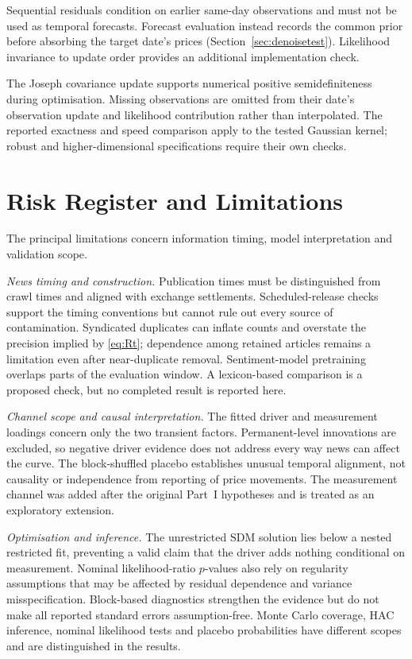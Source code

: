 \documentclass[journal]{IEEEtran}
\begin{document}
Sequential residuals condition on earlier same-day observations and must not be used as temporal forecasts. Forecast evaluation instead records the common prior before absorbing the target date's prices (Section~\ref{sec:denoisetest}). Likelihood invariance to update order provides an additional implementation check.

The Joseph covariance update supports numerical positive semidefiniteness during optimisation. Missing observations are omitted from their date's observation update and likelihood contribution rather than interpolated. The reported exactness and speed comparison apply to the tested Gaussian kernel; robust and higher-dimensional specifications require their own checks.

\section{Risk Register and Limitations}
\label{sec:risk}

The principal limitations concern information timing, model interpretation and validation scope.

\emph{News timing and construction.} Publication times must be distinguished from crawl times and aligned with exchange settlements. Scheduled-release checks support the timing conventions but cannot rule out every source of contamination. Syndicated duplicates can inflate counts and overstate the precision implied by \eqref{eq:Rt}; dependence among retained articles remains a limitation even after near-duplicate removal. Sentiment-model pretraining overlaps parts of the evaluation window. A lexicon-based comparison is a proposed check, but no completed result is reported here.

\emph{Channel scope and causal interpretation.} The fitted driver and measurement loadings concern only the two transient factors. Permanent-level innovations are excluded, so negative driver evidence does not address every way news can affect the curve. The block-shuffled placebo establishes unusual temporal alignment, not causality or independence from reporting of price movements. The measurement channel was added after the original Part~I hypotheses and is treated as an exploratory extension.

\emph{Optimisation and inference.} The unrestricted $\mathrm{SDM}$ solution lies below a nested restricted fit, preventing a valid claim that the driver adds nothing conditional on measurement. Nominal likelihood-ratio $p$-values also rely on regularity assumptions that may be affected by residual dependence and variance misspecification. Block-based diagnostics strengthen the evidence but do not make all reported standard errors assumption-free. Monte Carlo coverage, HAC inference, nominal likelihood tests and placebo probabilities have different scopes and are distinguished in the results.
\end{document}
